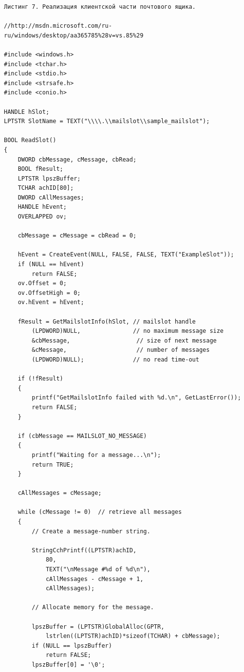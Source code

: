 \documentclass[a4paper,12pt]{article} %
\begin{document}
\vspace{3em}

\begin{verbatim}
Листинг 7. Реализация клиентской части почтового ящика.

//http://msdn.microsoft.com/ru-ru/windows/desktop/aa365785%28v=vs.85%29

#include <windows.h>
#include <tchar.h>
#include <stdio.h>
#include <strsafe.h>
#include <conio.h>

HANDLE hSlot;
LPTSTR SlotName = TEXT("\\\\.\\mailslot\\sample_mailslot");

BOOL ReadSlot()
{
    DWORD cbMessage, cMessage, cbRead;
    BOOL fResult;
    LPTSTR lpszBuffer;
    TCHAR achID[80];
    DWORD cAllMessages;
    HANDLE hEvent;
    OVERLAPPED ov;

    cbMessage = cMessage = cbRead = 0;

    hEvent = CreateEvent(NULL, FALSE, FALSE, TEXT("ExampleSlot"));
    if (NULL == hEvent)
        return FALSE;
    ov.Offset = 0;
    ov.OffsetHigh = 0;
    ov.hEvent = hEvent;

    fResult = GetMailslotInfo(hSlot, // mailslot handle 
        (LPDWORD)NULL,               // no maximum message size 
        &cbMessage,                   // size of next message 
        &cMessage,                    // number of messages 
        (LPDWORD)NULL);              // no read time-out 

    if (!fResult)
    {
        printf("GetMailslotInfo failed with %d.\n", GetLastError());
        return FALSE;
    }

    if (cbMessage == MAILSLOT_NO_MESSAGE)
    {
        printf("Waiting for a message...\n");
        return TRUE;
    }

    cAllMessages = cMessage;

    while (cMessage != 0)  // retrieve all messages
    {
        // Create a message-number string. 

        StringCchPrintf((LPTSTR)achID,
            80,
            TEXT("\nMessage #%d of %d\n"),
            cAllMessages - cMessage + 1,
            cAllMessages);

        // Allocate memory for the message. 

        lpszBuffer = (LPTSTR)GlobalAlloc(GPTR,
            lstrlen((LPTSTR)achID)*sizeof(TCHAR) + cbMessage);
        if (NULL == lpszBuffer)
            return FALSE;
        lpszBuffer[0] = '\0';


\end{verbatim}
\end{document}
